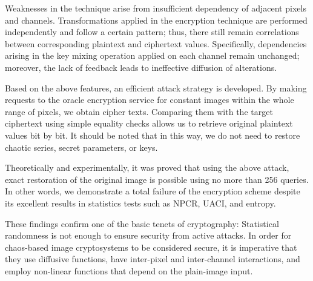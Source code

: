 Weaknesses in the technique arise from insufficient dependency of adjacent pixels and channels. Transformations applied in the encryption technique are performed independently and follow a certain pattern; thus, there still remain correlations between corresponding plaintext and ciphertext values. Specifically, dependencies arising in the key mixing operation applied on each channel remain unchanged; moreover, the lack of feedback leads to ineffective diffusion of alterations.

Based on the above features, an efficient attack strategy is developed. By making requests to the oracle encryption service for constant images within the whole range of pixels, we obtain cipher texts. Comparing them with the target ciphertext using simple equality checks allows us to retrieve original plaintext values bit by bit. It should be noted that in this way, we do not need to restore chaotic series, secret parameters, or keys.

Theoretically and experimentally, it was proved that using the above attack, exact restoration of the original image is possible using no more than 256 queries. In other words, we demonstrate a total failure of the encryption scheme despite its excellent results in statistics tests such as NPCR, UACI, and entropy.

These findings confirm one of the basic tenets of cryptography: Statistical randomness is not enough to ensure security from active attacks. In order for chaos-based image cryptosystems to be considered secure, it is imperative that they use diffusive functions, have inter-pixel and inter-channel interactions, and employ non-linear functions that depend on the plain-image input.
